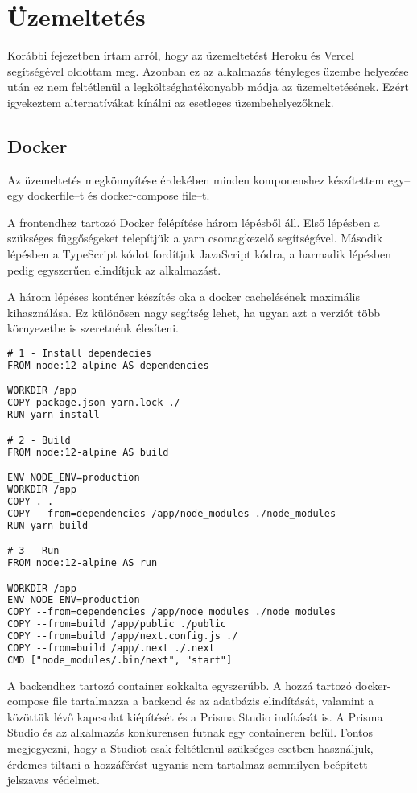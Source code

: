 \chapter{Üzemeltetés}
Korábbi fejezetben írtam arról, hogy az üzemeltetést Heroku és Vercel segítségével oldottam meg.
Azonban ez az alkalmazás tényleges üzembe helyezése után ez nem feltétlenül a legköltséghatékonyabb módja az üzemeltetésének.
Ezért igyekeztem alternatívákat kínálni az esetleges üzembehelyezőknek.

\section{Docker}
Az üzemeltetés megkönnyítése érdekében minden komponenshez készítettem egy–egy dockerfile–t és docker-compose file–t.

A frontendhez tartozó Docker felépítése három lépésből áll. Első lépésben a szükséges függőségeket telepítjük a yarn csomagkezelő segítségével.
Második lépésben a TypeScript kódot fordítjuk JavaScript kódra, a harmadik lépésben pedig egyszerűen elindítjuk az alkalmazást.

A három lépéses konténer készítés oka a docker cachelésének maximális kihasználása.
Ez különösen nagy segítség lehet, ha ugyan azt a verziót több környezetbe is szeretnénk élesíteni.

\begin{lstlisting}[language=TeX, caption=Frontend Dockerfile]
# 1 - Install dependecies
FROM node:12-alpine AS dependencies

WORKDIR /app
COPY package.json yarn.lock ./
RUN yarn install

# 2 - Build
FROM node:12-alpine AS build

ENV NODE_ENV=production
WORKDIR /app
COPY . .
COPY --from=dependencies /app/node_modules ./node_modules
RUN yarn build

# 3 - Run
FROM node:12-alpine AS run

WORKDIR /app
ENV NODE_ENV=production
COPY --from=dependencies /app/node_modules ./node_modules
COPY --from=build /app/public ./public
COPY --from=build /app/next.config.js ./
COPY --from=build /app/.next ./.next
CMD ["node_modules/.bin/next", "start"]
\end{lstlisting}

A backendhez tartozó container sokkalta egyszerűbb. 
A hozzá tartozó docker-compose file tartalmazza a backend és az adatbázis elindítását, valamint a közöttük lévő kapcsolat kiépítését és a Prisma Studio indítását is.
A Prisma Studio és az alkalmazás konkurensen futnak egy containeren belül.
Fontos megjegyezni, hogy a Studiot csak feltétlenül szükséges esetben használjuk, érdemes tiltani a hozzáférést ugyanis nem tartalmaz semmilyen beépített jelszavas védelmet.

